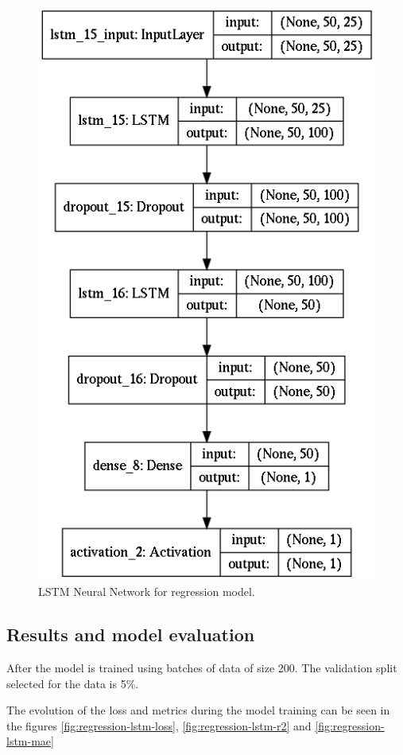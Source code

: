 \begin{figure}[H]
\centering
\includegraphics[scale=0.5]{Figures/regression-lstm-model}
\decoRule
\caption[LSTM Neural Network for regression model]{LSTM Neural Network for regression model.}
\label{fig:regression-lstm-model}
\end{figure}

\subsection{Results and model evaluation}

After the model is trained using batches of data of size 200.
The validation split selected for the data is 5\%.

The evolution of the loss and metrics during the model training can be seen in the figures \ref{fig:regression-lstm-loss}, \ref{fig:regression-lstm-r2} and \ref{fig:regression-lstm-mae}

